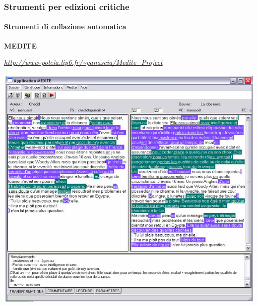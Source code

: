 \begin{frame}
    \frametitle{Strumenti per edizioni critiche}
    \framesubtitle{Strumenti di collazione automatica}
	\addtocounter{nframe}{1}
    \begin{center}
        \textbf{MEDITE}
    \end{center}
    \begin{center}
        \textit{\url{http://www-poleia.lip6.fr/~ganascia/Medite_Project}}
	\end{center}
    \begin{center}
        \includegraphics[width=.95\textwidth]{imgs/medite.png}
	\end{center}
\end{frame}




